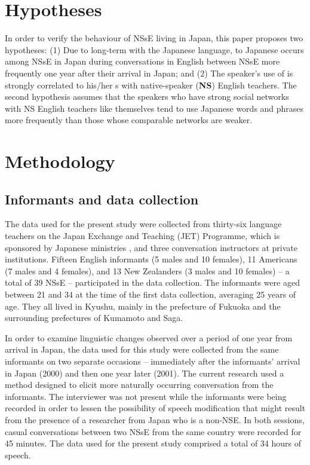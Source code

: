 \documentclass[output=paper]{LSP/langsci}
\begin{document}
\section{Hypotheses}
In order to verify the  behaviour of NSsE living in Japan, this paper proposes two hypotheses: (1) Due to long-term  with the Japanese language,  to Japanese occurs among NSsE in Japan during conversations in English between NSsE more frequently one year after their arrival in Japan; and (2) The speaker’s use of  is strongly correlated to his/her s with native-speaker (\textbf{NS}) English teachers. The second hypothesis assumes that the speakers who have strong social networks with NS English teachers like themselves tend to use Japanese words and phrases more frequently than those whose comparable networks are weaker.

\section{Methodology}
\subsection{Informants and data collection}
The data used for the present study were collected from thirty-six language teachers on the Japan Exchange and Teaching ({JET}) Programme, which is sponsored by Japanese ministries \citep{council_of_local_authorities_for_international_relations_[clair]_jet_2013}, and three conversation instructors at private institutions. Fifteen English informants (5 males and 10 females), 11 Americans (7 males and 4 females), and 13 New Zealanders (3 males and 10 females) -- a total of 39 NSsE -- participated in the data collection. The informants were aged between 21 and 34 at the time of the first data collection, averaging 25 years of age. They all lived in Kyushu, mainly in the prefecture of Fukuoka and the surrounding prefectures of Kumamoto and Saga.

In order to examine linguistic changes observed over a period of one year from arrival in Japan, the data used for this study were collected from the same informants on two separate occasions -- immediately after the informants’ arrival in Japan (2000) and then one year later (2001). The current research used a method designed to elicit more naturally occurring conversation from the informants. The interviewer was not present while the informants were being recorded in order to lessen the possibility of speech modification that might result from the presence of a researcher from Japan who is a non-NSE. In both sessions, casual conversations between two NSsE from the same country were recorded for 45 minutes. The data used for the present study comprised a total of 34 hours of speech.
\end{document}
